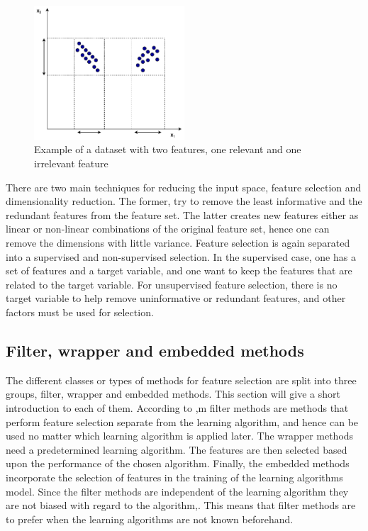     \begin{figure}
        \centering
        \includegraphics[width=0.5\textwidth]{report/figures/techniques/feature_selection.pdf}
        \caption{Example of a dataset with two features, one relevant and one irrelevant feature}
        \label{fig:feature_selection}
    \end{figure}
    
    There are two main techniques for reducing the input space, feature selection and dimensionality reduction. The former, try to remove the least informative and the redundant features from the feature set. The latter creates new features either as linear or non-linear combinations of the original feature set, hence one can remove the dimensions with little variance. Feature selection is again separated into a supervised and non-supervised selection. In the supervised case, one has a set of features and a target variable, and one want to keep the features that are related to the target variable. For unsupervised feature selection, there is no target variable to help remove uninformative or redundant features, and other factors must be used for selection.
    
    
    \subsection{Filter, wrapper and embedded methods}\label{subsec:filter_wrapper_embedded}
        The different classes or types of methods for feature selection are split into three groups, filter, wrapper and embedded methods. This section will give a short introduction to each of them.
        According to \cite{Liu2010},m filter methods are methods that perform feature selection separate from the learning algorithm, and hence can be used no matter which learning algorithm is applied later. The wrapper methods need a predetermined learning algorithm. The features are then selected based upon the performance of the chosen algorithm.  Finally, the embedded methods incorporate the selection of features in the training of the learning algorithms model. Since the filter methods are independent of the learning algorithm they are not biased with regard to the algorithm,\cite{Liu2010}. This means that filter methods are to prefer when the learning algorithms are not known beforehand. 
        

